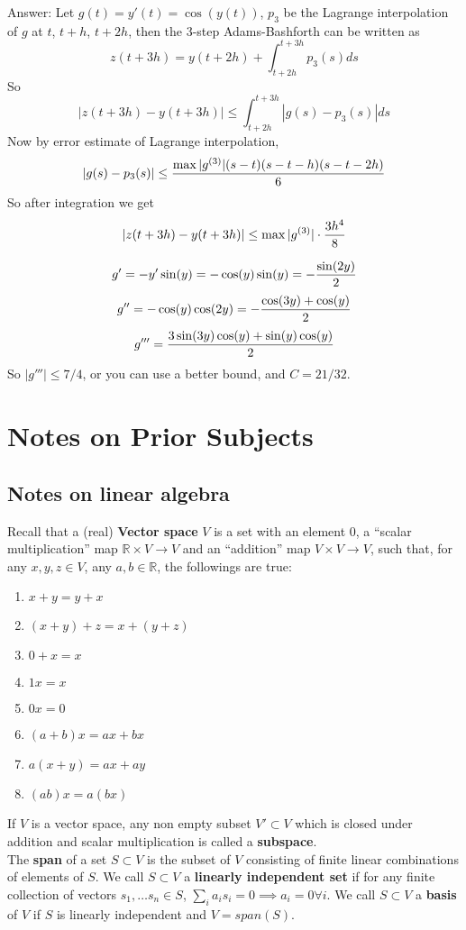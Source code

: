 \documentclass[20pt]{article} %
\theoremstyle{break}
\begin{document}
Answer: Let $g(t)=y'(t)=\cos(y(t))$, $p_3$ be the Lagrange interpolation of $g$ at $t$, $t+h$, $t+2h$, then the 3-step Adams-Bashforth can be written as
\[z(t+3h)=y(t+2h)+\int_{t+2h}^{t+3h}p_3(s)ds\]
So
\[|z(t+3h)-y(t+3h)|\leq \int_{t+2h}^{t+3h}|g(s)-p_3(s)|ds\]
Now by error estimate of Lagrange interpolation,
\[|g(s)-p_3(s)|\leq{\max|g^{(3)}|(s-t)(s-t-h)(s-t-2h)\over 6}\]
So after integration we get
\[|z(t+3h)-y(t+3h)|\leq \max|g^{(3)}|\cdot{3h^4\over 8}\]

\[g'=-y'\sin(y)=-\cos(y)\sin(y)=-{\sin(2y)\over 2}\]
\[g''=-\cos(y)\cos(2y)=-{\cos(3y)+\cos(y)\over 2}\]
\[g'''={3\sin(3y)\cos(y)+\sin(y)\cos(y)\over 2}\]
So $|g'''|\leq 7/4$, or you can use a better bound, and $C=21/32$.

\section{Notes on Prior Subjects}

\subsection{Notes on linear algebra}

Recall that a (real) {\bf Vector space} $V$ is a set with an element $0$, a ``scalar multiplication'' map $\mathbb{R}\times V\rightarrow V$ and an ``addition'' map $V\times V\rightarrow V$, such that, for any $x, y, z\in V$, any $a, b\in \mathbb{R}$, the followings are true:
\begin{enumerate}
\item $x+y=y+x$
\item $(x+y)+z=x+(y+z)$
\item $0+x=x$
\item $1x=x$
\item $0x=0$
\item $(a+b)x=ax+bx$
\item $a(x+y)=ax+ay$
\item $(ab)x=a(bx)$
\end{enumerate}

If $V$ is a vector space, any non empty subset $V'\subset V$ which is closed under addition and scalar multiplication is called a {\bf subspace}.\\

The {\bf span} of a set $S\subset V$ is the subset of $V$ consisting of finite linear combinations of elements of $S$. We call $S\subset V$ a {\bf linearly independent set} if for any finite collection of vectors $s_1, \dots s_n\in S$, $\sum_ia_is_i=0\implies a_i=0\forall i$. We call $S\subset V$ a {\bf basis} of $V$ if $S$ is linearly independent and $V=span(S)$.\\
\end{document}
